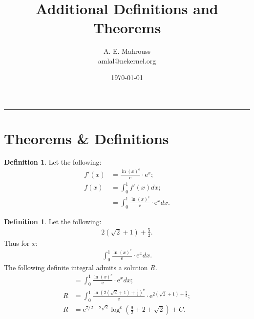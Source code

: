 \documentclass[10pt]{article}
\title{%
	\vspace{-1.5em}%
	\large\textbf{Additional Definitions and Theorems}%
}
\author{A. E. Mahrouss\\amlal@nekernel.org}
\date{\today}
\theoremstyle{plain}
\theoremstyle{definition}
\newtheorem{definition}[theorem]{Definition}
\theoremstyle{remark}
\begin{document}
	
	\maketitle
	\vspace{-0.5em}
	\vspace{0.8em}
	\rule{\linewidth}{0.4pt}
	\vspace{1em}
	
	\section{Theorems \& Definitions}
	
	\begin{definition}
		Let the following:
		\begin{align*}
			f'(x)&= \frac{\ln (x)^{\mathrm{e}}}{\mathrm{e}} \cdot \mathrm{e}^{x};\\
			f(x) &= \int_{0}^{1} f'(x)dx;\\
			&= \int_{0}^{1} \frac{\ln (x)^{\mathrm{e}}}{\mathrm{e}} \cdot \mathrm{e}^{x} dx.
		\end{align*}
	\end{definition}
	
	\begin{definition}
		Let the following:
		\begin{align*}
			2(\sqrt{2} + 1) + \frac{5}{2}.
		\end{align*}
		Thus for $x$:
		\begin{align*}
			\int_{0}^{1} \frac{\ln (x)^{\mathrm{e}}}{\mathrm{e}} \cdot \mathrm{e}^{x} dx.
		\end{align*}
		The following definite integral admits a solution $R$.
		\begin{align*}
			&= \int_{0}^{1} \frac{\ln (x)^{\mathrm{e}}}{\mathrm{e}} \cdot \mathrm{e}^{x} dx;\\
			R &= \int_{0}^{1} \frac{\ln (2(\sqrt{2} + 1) + \frac{5}{2})^{\mathrm{e}}}{\mathrm{e}} \cdot \mathrm{e}^{2(\sqrt{2} + 1) + \frac{5}{2}};\\
			R &= \mathrm{e}^{7/2+2 \sqrt{2}} \log^{e}(\frac{9}{2}+2+\sqrt{2}) + C.
		\end{align*}
	\end{definition}
	
	\nocite{*}
	
	
	
	
\end{document}
